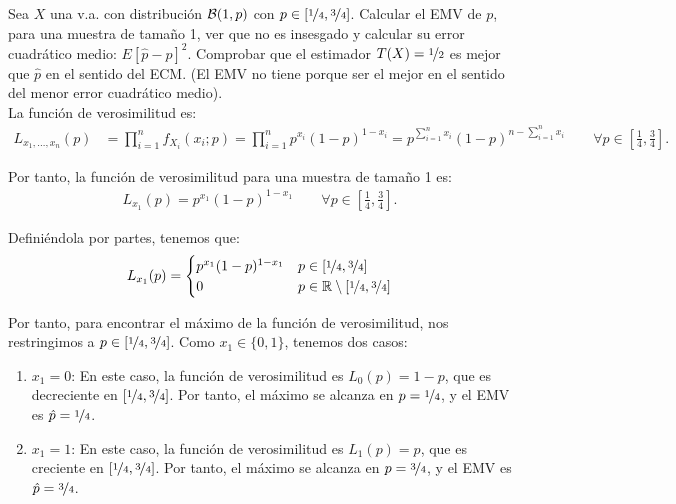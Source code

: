 \begin{ejemplo}
    Sea $X$ una v.a. con distribución $\mathcal{B}(1, p)$ con $p \in \left[\nicefrac{1}{4}, \nicefrac{3}{4}\right]$. Calcular el EMV de $p$, para una muestra de tamaño 1, ver que no es insesgado y calcular su error cuadrático medio: $E[\hat{p} - p]^2$. Comprobar que el estimador $T(X) = \nicefrac{1}{2}$ es mejor que $\hat{p}$ en el sentido del ECM. (El EMV no tiene porque ser el mejor en el sentido del menor error cuadrático medio).\\

    La función de verosimilitud es:
    \begin{align*}
        L_{x_1, \ldots, x_n}(p) &= \prod_{i=1}^{n} f_{X_i}(x_i; p) = \prod_{i=1}^{n} p^{x_i}(1-p)^{1-x_i} = p^{\sum\limits_{i=1}^{n} x_i}(1-p)^{n - \sum\limits_{i=1}^{n} x_i}\qquad \forall p \in \left[\frac{1}{4}, \frac{3}{4}\right].
    \end{align*}

    Por tanto, la función de verosimilitud para una muestra de tamaño 1 es:
    \begin{align*}
        L_{x_1}(p) = p^{x_1}(1-p)^{1-x_1} \qquad \forall p \in \left[\frac{1}{4}, \frac{3}{4}\right].
    \end{align*}

    Definiéndola por partes, tenemos que:
    \begin{align*}
        L_{x_1}(p) = \begin{cases}
            p^{x_1}(1-p)^{1-x_1} & p \in \left[\nicefrac{1}{4}, \nicefrac{3}{4}\right]\\
            0 & p \in \mathbb{R} \setminus \left[\nicefrac{1}{4}, \nicefrac{3}{4}\right]
        \end{cases}
    \end{align*}

    Por tanto, para encontrar el máximo de la función de verosimilitud, nos restringimos a $p \in \left[\nicefrac{1}{4}, \nicefrac{3}{4}\right]$. Como $x_1 \in \{0, 1\}$, tenemos dos casos:
    \begin{enumerate}
        \item $x_1 = 0$: En este caso, la función de verosimilitud es $L_{0}(p) = 1 - p$, que es decreciente en $\left[\nicefrac{1}{4}, \nicefrac{3}{4}\right]$. Por tanto, el máximo se alcanza en $p = \nicefrac{1}{4}$, y el EMV es $\hat{p} = \nicefrac{1}{4}$.
        \item $x_1 = 1$: En este caso, la función de verosimilitud es $L_{1}(p) = p$, que es creciente en $\left[\nicefrac{1}{4}, \nicefrac{3}{4}\right]$. Por tanto, el máximo se alcanza en $p = \nicefrac{3}{4}$, y el EMV es $\hat{p} = \nicefrac{3}{4}$.
    \end{enumerate}


\end{ejemplo}
